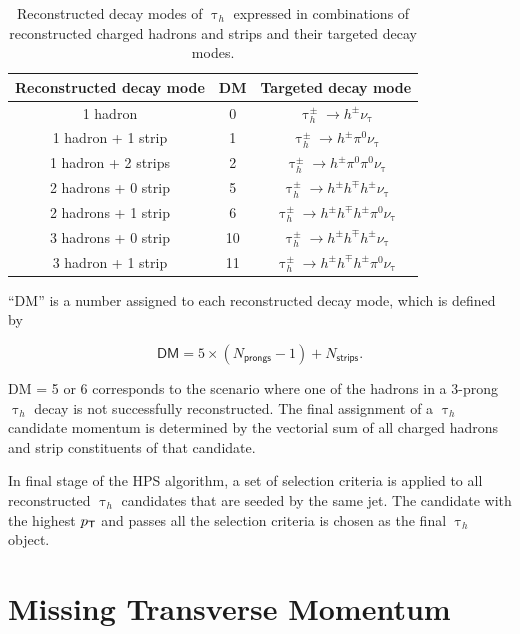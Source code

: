 \begin{table}[th]
\sffamily
\centering
\caption{Reconstructed decay modes of $\uptau_h$ expressed in combinations of reconstructed charged hadrons and strips and their targeted decay modes.}
\begin{tabular}{ccc}
\toprule
Reconstructed decay mode & DM & Targeted decay mode \\
\midrule
1 hadron & 0 & $\uptau_{h}^{\pm}\rightarrow h^{\pm}\nu_{\uptau} $\\
1 hadron + 1 strip & 1 & $\uptau_{h}^{\pm}\rightarrow h^{\pm}\pi^{0}\nu_{\uptau} $\\
1 hadron + 2 strips & 2 & $\uptau_{h}^{\pm}\rightarrow h^{\pm}\pi^{0}\pi^{0}\nu_{\uptau} $\\
2 hadrons + 0 strip & 5 & $\uptau_{h}^{\pm}\rightarrow h^{\pm}h^{\mp}h^{\pm}\nu_{\uptau} $\\
2 hadrons + 1 strip & 6 & $\uptau_{h}^{\pm}\rightarrow h^{\pm}h^{\mp}h^{\pm}\pi^{0}\nu_{\uptau} $\\
3 hadrons + 0 strip & 10 & $\uptau_{h}^{\pm}\rightarrow h^{\pm}h^{\mp}h^{\pm}\nu_{\uptau} $\\
3 hadron + 1 strip & 11 & $\uptau_{h}^{\pm}\rightarrow h^{\pm}h^{\mp}h^{\pm}\pi^{0}\nu_{\uptau} $\\
\bottomrule
\end{tabular}
\label{tab:DM}
\end{table}

``DM'' is a number assigned to each reconstructed decay mode, which is defined by 

\begin{equation}
\textsf{DM} = 5\times(N_{\textsf{prongs}}-1)+N_{\textsf{strips}}.
\end{equation}

DM = 5 or 6 corresponds to the scenario where one of the hadrons in a 3-prong $\uptau_h$ decay is not successfully reconstructed. The final assignment of a $\uptau_h$ candidate momentum is determined by the vectorial sum of all charged hadrons and strip constituents of that candidate. 

In final stage of the \ac{HPS} algorithm, a set of selection criteria is applied to all reconstructed $\uptau_h$ candidates that are seeded by the same jet. The candidate with the highest $p_{\textsf{T}}$ and passes all the selection criteria is chosen as the final $\uptau_h$ object. 

\section{Missing Transverse Momentum}
\label{sec:MET}

